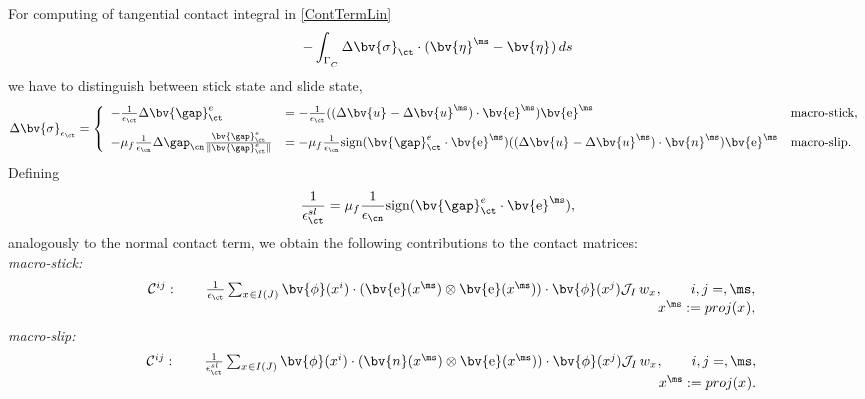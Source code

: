 For computing of tangential contact integral in \ref{ContTermLin}
\begin{equation*}
- \int_{\Gamma^{\sl}_C} \Delta \bv{\sigma}_{\ct} \cdot (\bv{\eta}^{\ms} - \bv{\eta}^{\sl}) \, ds
\end{equation*}
we have to distinguish between stick state and slide state,
\begin{equation*}
    \Delta \bv{\sigma}_{\epsilon_\ct} =
            \left\{   
             \begin{array}{lll}     
 -{\frac{1}{\epsilon_{\ct}}} \Delta \bv{\gap}^e_{\ct} & = - {\frac{1}{\epsilon_{\ct}}} ((\Delta \bv{u}^{\sl} - \Delta \bv{u}^{\ms}) \cdot \bv{\mathrm{e}}^{\ms}) \bv{\mathrm{e}}^{\ms}  
  &\mbox{macro-stick},\\[2ex]
 -\mu_f {\frac{1}{\epsilon_{\cn}}} \Delta \gap_{\cn} \frac{\bv{\gap}^e_{\ct}}{\Vert \bv{\gap}^e_{\ct} \Vert} 
 & = - \mu_f {\frac{1}{\epsilon_{\cn}}} \mbox{sign} (\bv{\gap}^e_{\ct} \cdot \bv{\mathrm{e}}^{\ms}) ((\Delta \bv{u}^{\sl} - \Delta \bv{u}^{\ms}) 
 \cdot \bv{n}^{\ms}) \bv{\mathrm{e}}^{\ms} & \mbox{macro-slip}.
             \end{array}    
            \right.       
\end{equation*}
Defining
\begin{equation*}
    {\frac{1}{\epsilon^{sl}_{\ct}}} = \mu_f {\frac{1}{\epsilon_{\cn}}} \mbox{sign} (\bv{\gap}^e_{\ct} \cdot \bv{\mathrm{e}}^{\ms}),
\end{equation*}
analogously to the normal contact term, we obtain the following contributions to the contact matrices:\\
{\it macro-stick: }
\begin{equation*}
\begin{array}{r}
\qquad \mathcal{C}^{ij}: \qquad {\frac{1}{\epsilon_{\ct}}} \sum_{x^{\sl} \in I(J)} \bv{\phi}(x^i) \cdot (\bv{\mathrm{e}}(x^{\ms}) \otimes \bv{\mathrm{e}}(x^{\ms})) \cdot \bv{\phi}(x^j) \mathcal{J}_I \, w_{x^{\sl}}, \qquad i,j=\sl,\ms,\\
x^{\ms} := proj(x^{\sl}),
\end{array}
\end{equation*}
{\it macro-slip:  }
\begin{equation*}
\begin{array}{r}
\qquad \mathcal{C}^{ij}: \qquad {\frac{1}{\epsilon^{sl}_{\ct}}} \sum_{x^{\sl} \in I(J)} \bv{\phi}(x^i) \cdot (\bv{n}(x^{\ms}) \otimes \bv{\mathrm{e}}(x^{\ms})) \cdot \bv{\phi}(x^j) \mathcal{J}_I \, w_{x^{\sl}}, \qquad i,j=\sl,\ms,\\
x^{\ms} := proj(x^{\sl}).
\end{array}
\end{equation*}

